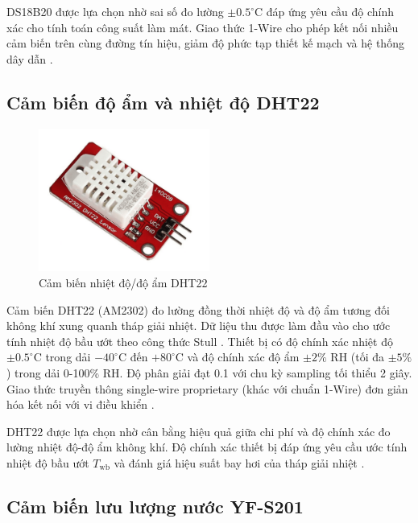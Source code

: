\documentclass[../main.tex]{subfiles}
\begin{document}
DS18B20 được lựa chọn nhờ sai số đo lường $\pm 0.5^\circ\mathrm{C}$ đáp ứng yêu cầu độ chính xác cho tính toán công suất làm mát. Giao thức 1-Wire cho phép kết nối nhiều cảm biến trên cùng đường tín hiệu, giảm độ phức tạp thiết kế mạch và hệ thống dây dẫn \cite{datasheet_DS18B20}.

\subsection{Cảm biến độ ẩm và nhiệt độ DHT22}
\label{sec:dht22_sensor}

\begin{figure}[H]
    \centering
    \includegraphics[width=0.5\textwidth]{../Hinhve/DHT22.png}
    \caption{Cảm biến nhiệt độ/độ ẩm DHT22 \cite{datasheet_DHT22}}
    \label{fig:dht22}
\end{figure}

Cảm biến DHT22 (AM2302) đo lường đồng thời nhiệt độ và độ ẩm tương đối không khí xung quanh tháp giải nhiệt. Dữ liệu thu được làm đầu vào cho ước tính nhiệt độ bầu ướt theo công thức Stull \cite{datasheet_DHT22,stull2011meteorology}. Thiết bị có độ chính xác nhiệt độ $\pm 0.5^\circ\mathrm{C}$ trong dải $-40^\circ\mathrm{C}$ đến $+80^\circ\mathrm{C}$ và độ chính xác độ ẩm $\pm 2\%$ RH (tối đa $\pm 5\%$) trong dải 0-100\% RH. Độ phân giải đạt 0.1 với chu kỳ sampling tối thiểu 2 giây. Giao thức truyền thông single-wire proprietary (khác với chuẩn 1-Wire) đơn giản hóa kết nối với vi điều khiển \cite{datasheet_DHT22}.

DHT22 được lựa chọn nhờ cân bằng hiệu quả giữa chi phí và độ chính xác đo lường nhiệt độ-độ ẩm không khí. Độ chính xác thiết bị đáp ứng yêu cầu ước tính nhiệt độ bầu ướt $T_\mathrm{wb}$ và đánh giá hiệu suất bay hơi của tháp giải nhiệt \cite{datasheet_DHT22,stull2011meteorology}.

\subsection{Cảm biến lưu lượng nước YF-S201}
\label{sec:yf_s201_sensor}
\end{document}
